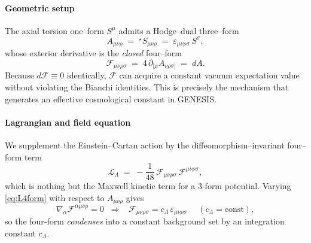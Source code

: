 \documentclass{article}
\begin{document}
\paragraph{Geometric setup}
The axial torsion one--form $S^\mu$ admits a Hodge--dual three--form
\begin{equation}
  A_{\mu\nu\rho}\;=\;{}^{\star}\!S_{\mu\nu\rho}
  \;=\;\varepsilon_{\mu\nu\rho\sigma}\,S^{\sigma},
\end{equation}
whose exterior derivative is the \emph{closed} four--form
\begin{equation}\label{eq:Fdef}
  \mathcal F_{\mu\nu\rho\sigma}\;=\;4\,\partial_{[\mu}A_{\nu\rho\sigma]}
  \;=\;dA .
\end{equation}
Because $d\mathcal F\equiv0$ identically, $\mathcal F$ can acquire a constant
vacuum expectation value without violating the Bianchi identities.  This is
precisely the mechanism that generates an effective cosmological constant in
GENESIS.

\paragraph{Lagrangian and field equation}
We supplement the Einstein--Cartan action by the diffeomorphism--invariant
four--form term
\begin{equation}\label{eq:L4form}
  \mathcal L_\Lambda \;=\;
  -\frac{1}{48}\,\mathcal F_{\mu\nu\rho\sigma}\,
                    \mathcal F^{\mu\nu\rho\sigma},
\end{equation}
which is nothing but the Maxwell kinetic term for a 3‑form potential.  Varying
\eqref{eq:L4form} with respect to $A_{\mu\nu\rho}$ gives
\begin{equation}\label{eq:eomF}
  \nabla_\alpha \mathcal F^{\alpha\mu\nu\rho}=0
  \;\;\Longrightarrow\;\;
  \boxed{\;
  \mathcal F_{\mu\nu\rho\sigma} =
  c_\Lambda\,\varepsilon_{\mu\nu\rho\sigma}
  \;}
  \quad(c_\Lambda=\text{const}),
\end{equation}
so the four‑form \emph{condenses} into a constant background set by an
integration constant $c_\Lambda$.
\end{document}
